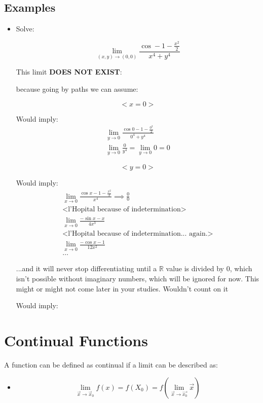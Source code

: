 \documentclass[11pt,fleqn]{book} %
\begin{document}
\subsection{Examples}
\begin{itemize}
    \item Solve:

\begin{equation}
    \lim_{(x,y) \to (0,0)}  \frac{\cos - 1 - \frac{x^2}{2}}{x^4+y^4}
\end{equation}

This limit \textbf{DOES NOT EXIST}:

because going by paths we can assume:

$$<x=0>$$

Would imply:
\begin{gather}
    \lim_{y \to 0} \frac{\cos 0 - 1 - \frac{0^2}{2}}{0^4 + y^4} \\
    \lim_{y \to 0} \frac{0}{y^4} = \lim_{y \to 0} 0 = 0
\end{gather}

$$<y=0>$$

Would imply:
\begin{gather}
    \lim_{x \to 0} \frac{\cos x - 1 - \frac{x^2}{2}}{x^4} \implies \frac{0}{0} \\
    \text{<l'Hopital because of indetermination>}\\
    \lim_{x \to 0} \frac{- \sin x - x}{4x^3} \\
    \text{<l'Hopital because of indetermination... again.>} \\
    \lim_{x \to 0} \frac{- \cos x - 1}{12x^2} \\
    \dots
\end{gather}

...and it will never stop differentiating until a $\mathbb{R}$ value is divided by 0, which
isn't possible without imaginary numbers, which will be ignored for now. This might or might not come later in your studies. Wouldn't count on it

Would imply:
\end{itemize}
\section{Continual Functions}

A function can be defined as continual if a limit can be described as:

\begin{itemize}
    \item $$\lim_{\vec{x} \to \vec{x}_0}f(x) = f(X_0) = f(\lim_{\vec{x} \to \vec{x_0}} \vec{x})$$
\end{itemize}
\end{document}
